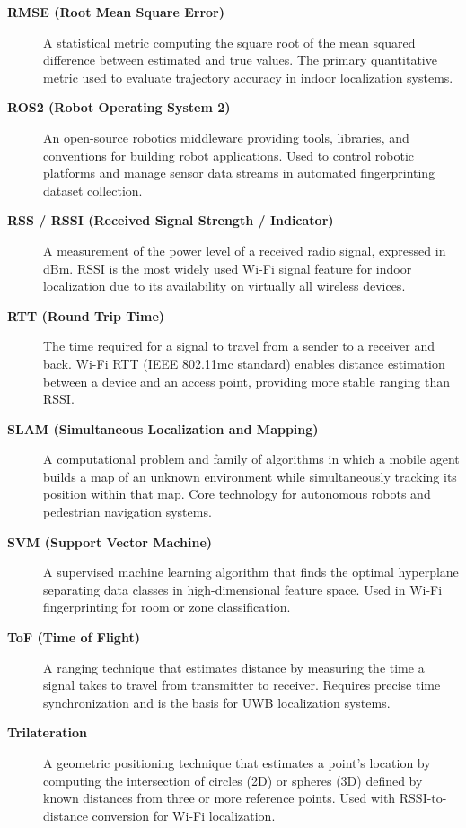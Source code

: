 \documentclass{ipgpmaster}
\begin{document}
\begin{description}
\item[\textbf{RMSE (Root Mean Square Error)}]
A statistical metric computing the square root of the mean squared difference between estimated and true values. The primary quantitative metric used to evaluate trajectory accuracy in indoor localization systems.

\item[\textbf{ROS2 (Robot Operating System 2)}]
An open-source robotics middleware providing tools, libraries, and conventions for building robot applications. Used to control robotic platforms and manage sensor data streams in automated fingerprinting dataset collection.

\item[\textbf{RSS / RSSI (Received Signal Strength / Indicator)}]
A measurement of the power level of a received radio signal, expressed in dBm. RSSI is the most widely used Wi-Fi signal feature for indoor localization due to its availability on virtually all wireless devices.

\item[\textbf{RTT (Round Trip Time)}]
The time required for a signal to travel from a sender to a receiver and back. Wi-Fi RTT (IEEE 802.11mc standard) enables distance estimation between a device and an access point, providing more stable ranging than RSSI.

\item[\textbf{SLAM (Simultaneous Localization and Mapping)}]
A computational problem and family of algorithms in which a mobile agent builds a map of an unknown environment while simultaneously tracking its position within that map. Core technology for autonomous robots and pedestrian navigation systems.

\item[\textbf{SVM (Support Vector Machine)}]
A supervised machine learning algorithm that finds the optimal hyperplane separating data classes in high-dimensional feature space. Used in Wi-Fi fingerprinting for room or zone classification.

\item[\textbf{ToF (Time of Flight)}]
A ranging technique that estimates distance by measuring the time a signal takes to travel from transmitter to receiver. Requires precise time synchronization and is the basis for UWB localization systems.

\item[\textbf{Trilateration}]
A geometric positioning technique that estimates a point's location by computing the intersection of circles (2D) or spheres (3D) defined by known distances from three or more reference points. Used with RSSI-to-distance conversion for Wi-Fi localization.


\end{description}
\end{document}
